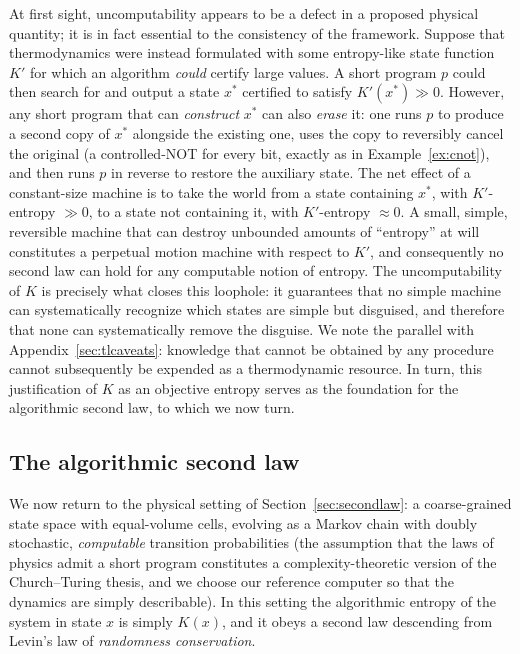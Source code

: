 \documentclass[11pt]{article}
\begin{document}
At first sight, uncomputability appears to be a defect in a proposed physical quantity; it is in fact essential to the consistency of the framework. Suppose that thermodynamics were instead formulated with some entropy-like state function $K'$ for which an algorithm \emph{could} certify large values. A short program $p$ could then search for and output a state $x^*$ certified to satisfy $K'(x^*) \gg 0$. However, any short program that can \emph{construct} $x^*$ can also \emph{erase} it: one runs $p$ to produce a second copy of $x^*$ alongside the existing one, uses the copy to reversibly cancel the original (a controlled-NOT for every bit, exactly as in Example~\ref{ex:cnot}), and then runs $p$ in reverse to restore the auxiliary state. The net effect of a constant-size machine is to take the world from a state containing $x^*$, with $K'$-entropy $\gg 0$, to a state not containing it, with $K'$-entropy $\approx 0$. A small, simple, reversible machine that can destroy unbounded amounts of ``entropy'' at will constitutes a perpetual motion machine with respect to $K'$, and consequently no second law can hold for any computable notion of entropy. The uncomputability of $K$ is precisely what closes this loophole: it guarantees that no simple machine can systematically recognize which states are simple but disguised, and therefore that none can systematically remove the disguise. We note the parallel with Appendix~\ref{sec:tlcaveats}: knowledge that cannot be obtained by any procedure cannot subsequently be expended as a thermodynamic resource. In turn, this justification of $K$ as an objective entropy serves as the foundation for the algorithmic second law, to which we now turn.

\subsection{The algorithmic second law}
\label{sec:algsecondlaw}

We now return to the physical setting of Section~\ref{sec:secondlaw}: a coarse-grained state space with equal-volume cells, evolving as a Markov chain with doubly stochastic, \emph{computable} transition probabilities (the assumption that the laws of physics admit a short program constitutes a complexity-theoretic version of the Church--Turing thesis, and we choose our reference computer so that the dynamics are simply describable). In this setting the algorithmic entropy of the system in state $x$ is simply $K(x)$, and it obeys a second law descending from Levin's law of \emph{randomness conservation}.
\end{document}
